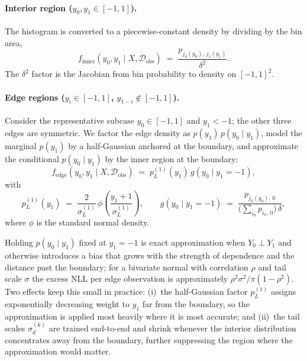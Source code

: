 \documentclass[11pt]{article}
\begin{document}
\paragraph{Interior region ($y_{0}, y_{1} \in [-1, 1]$).}
The histogram is converted to a piecewise-constant density by dividing
by the bin area,
\begin{equation}
  f_{\mathrm{inner}}(y_{0}, y_{1} \mid X, \mathcal{D}_{\mathrm{obs}})
  \;=\;
  \frac{p_{j_{0}(y_{0}),\, j_{1}(y_{1})}}{\delta^{2}}.
  \label{eq:inner-density}
\end{equation}
The $\delta^{2}$ factor is the Jacobian from bin probability to density
on $[-1, 1]^{2}$.

\paragraph{Edge regions ($y_{i} \in [-1, 1]$, $y_{1-i} \notin [-1, 1]$).}
Consider the representative subcase $y_{0} \in [-1, 1]$ and $y_{1} < -1$;
the other three edges are symmetric. We factor the edge density as
$p(y_{1})\, p(y_{0} \mid y_{1})$, model the marginal $p(y_{1})$ by a
half-Gaussian anchored at the boundary, and approximate the conditional
$p(y_{0} \mid y_{1})$ by the inner region at the boundary:
\begin{equation}
  f_{\mathrm{edge}}(y_{0}, y_{1} \mid X, \mathcal{D}_{\mathrm{obs}})
  \;=\;
  p_{L}^{(1)}(y_{1})\, g(y_{0} \mid y_{1} = -1),
  \label{eq:mix-density}
\end{equation}
with
\begin{equation}
  p_{L}^{(1)}(y_{1})
  \;=\;
  \frac{2}{\sigma_{L}^{(1)}}\,
  \phi\!\left(\frac{y_{1} + 1}{\sigma_{L}^{(1)}}\right),
  \qquad
  g(y_{0} \mid y_{1} = -1)
  \;=\;
  \frac{p_{j_{0}(y_{0}),\, 0}}
       {\bigl(\sum_{i_{0}} p_{i_{0},\, 0}\bigr)\, \delta},
  \label{eq:boundary-conditional}
\end{equation}
where $\phi$ is the standard normal density. 

Holding $p(y_{0} \mid y_{1})$ fixed at $y_{1} = -1$ is exact approximation when $Y_{0} \perp Y_{1}$ and otherwise
introduces a bias that grows with the strength of dependence and the
distance past the boundary; for a bivariate normal with correlation
$\rho$ and tail scale $\sigma$ the excess NLL per edge observation is
approximately $\rho^{2}\sigma^{2} / \pi(1 - \rho^{2})$. Two effects
keep this small in practice: (i)~the half-Gaussian factor
$p_{L}^{(1)}$ assigns exponentially decreasing weight to $y_{1}$ far
from the boundary, so the approximation is applied most heavily where
it is most accurate; and (ii)~the tail scales $\sigma_{d}^{(k)}$ are
trained end-to-end and shrink whenever the interior distribution
concentrates away from the boundary, further suppressing the region
where the approximation would matter.
\end{document}
